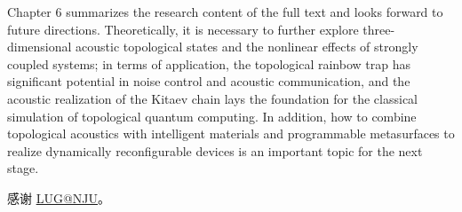 \documentclass[
    type = doctor,
  ]{njuthesis}
\begin{document}
\begin{abstract*}
  Chapter 6 summarizes the research content of the full text and looks forward to future directions. Theoretically, it is necessary to further explore three-dimensional acoustic topological states and the nonlinear effects of strongly coupled systems; in terms of application, the topological rainbow trap has significant potential in noise control and acoustic communication, and the acoustic realization of the Kitaev chain lays the foundation for the classical simulation of topological quantum computing. In addition, how to combine topological acoustics with intelligent materials and programmable metasurfaces to realize dynamically reconfigurable devices is an important topic for the next stage. 
\end{abstract*}

\tableofcontents

\mainmatter












\printbibliography


\begin{acknowledgement}
  感谢 \href{https://git.nju.edu.cn/nju-lug/lug-introduction}{LUG@NJU}。
\end{acknowledgement}
\end{document}
